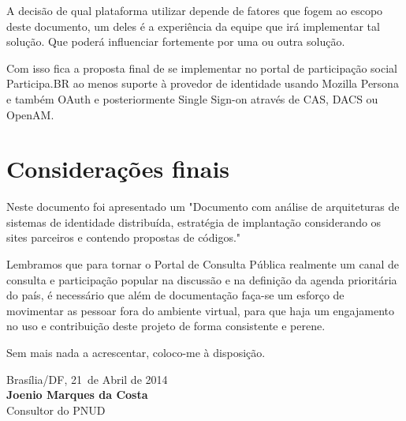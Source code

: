 \documentclass[11pt]{article}
\newcommand{\MyName}{Joenio Marques da Costa}
\newcommand{\ProductDescription}{"Documento com análise de arquiteturas de
        sistemas de identidade distribuída, estratégia de implantação
        considerando os sites parceiros e contendo propostas de códigos."
}
\newcommand{\MesEntrega}{Abril de 2014}
\newcommand{\DiaEntrega}{21}
\begin{document}
A decisão de qual plataforma utilizar depende de fatores que fogem ao escopo
deste documento, um deles é a experiência da equipe que irá implementar tal
solução. Que poderá influenciar fortemente por uma ou outra solução.

Com isso fica a proposta final de se implementar no portal de participação
social Participa.BR ao menos suporte à provedor de identidade usando Mozilla
Persona e também OAuth e posteriormente Single Sign-on através de CAS, DACS ou
OpenAM.

\section{Considerações finais}

Neste documento foi apresentado um \ProductDescription

Lembramos que para tornar o Portal de Consulta Pública realmente um canal de
consulta e participação popular na discussão e na definição da agenda
prioritária do país, é necessário que além de documentação faça-se um esforço
de movimentar as pessoar fora do ambiente virtual, para que haja um
engajamento no uso e contribuição deste projeto de forma consistente e perene.



\vspace{1cm}

Sem mais nada a acrescentar, coloco-me à disposição.

\vspace{1cm}

\begin{minipage}{\textwidth}
  Brasília/DF, \DiaEntrega \ de \MesEntrega\\[1cm]
  \textbf{\MyName}\\
  \small Consultor do PNUD
\end{minipage}
\end{document}
